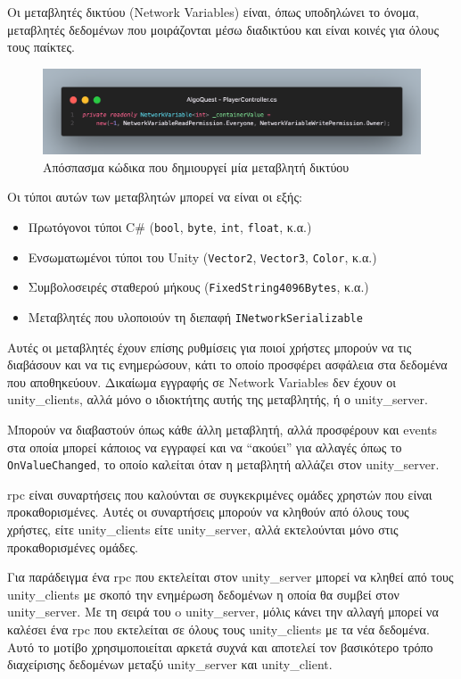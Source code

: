 Οι μεταβλητές δικτύου (Network Variables) είναι, όπως υποδηλώνει το όνομα, μεταβλητές δεδομένων που μοιράζονται μέσω διαδικτύου και είναι κοινές για όλους τους παίκτες.

\begin{figure}[H]
    \centering
    \includegraphics[width=0.8\linewidth]{sections/4/4/images/unity_code_network_variable}
    \caption{Απόσπασμα κώδικα που δημιουργεί μία μεταβλητή δικτύου}
    \label{fig:unity_code_network_variable}
\end{figure}

Οι τύποι αυτών των μεταβλητών μπορεί να είναι οι εξής:
\begin{itemize}
    \item Πρωτόγονοι τύποι C\# (\verb|bool|, \verb|byte|, \verb|int|, \verb|float|, κ.α.)
    \item Ενσωματωμένοι τύποι του Unity (\verb|Vector2|, \verb|Vector3|, \verb|Color|, κ.α.)
    \item Συμβολοσειρές σταθερού μήκους (\verb|FixedString4096Bytes|, κ.α.)
    \item Μεταβλητές που υλοποιούν τη διεπαφή \verb|INetworkSerializable|\cite{noauthor_networkvariables_2024}
\end{itemize}

Αυτές οι μεταβλητές έχουν επίσης ρυθμίσεις για ποιοί χρήστες μπορούν να τις διαβάσουν και να τις ενημερώσουν, κάτι το οποίο προσφέρει ασφάλεια στα δεδομένα που αποθηκεύουν. Δικαίωμα εγγραφής σε Network Variables δεν έχουν οι \Glspl{unity_client}, αλλά μόνο ο ιδιοκτήτης αυτής της μεταβλητής, ή ο \Gls{unity_server}.

Μπορούν να διαβαστούν όπως κάθε άλλη μεταβλητή, αλλά προσφέρουν και events στα οποία μπορεί κάποιος να εγγραφεί και να “ακούει” για αλλαγές όπως το \verb|OnValueChanged|, το οποίο καλείται όταν η μεταβλητή αλλάζει στον \Gls{unity_server}.

\acrfull{rpc} είναι συναρτήσεις που καλούνται σε συγκεκριμένες ομάδες χρηστών που είναι προκαθορισμένες. Αυτές οι συναρτήσεις μπορούν να κληθούν από όλους τους χρήστες, είτε \Glspl{unity_client} είτε \Gls{unity_server}, αλλά εκτελούνται μόνο στις προκαθορισμένες ομάδες\cite{noauthor_rpc_2024}.

Για παράδειγμα ένα \acrshort{rpc} που εκτελείται στον \Gls{unity_server} μπορεί να κληθεί από τους \Glspl{unity_client} με σκοπό την ενημέρωση δεδομένων η οποία θα συμβεί στον \Gls{unity_server}. Με τη σειρά του o \Gls{unity_server}, μόλις κάνει την αλλαγή μπορεί να καλέσει ένα \acrshort{rpc} που εκτελείται σε όλους τους \Glspl{unity_client} με τα νέα δεδομένα. Αυτό το μοτίβο χρησιμοποιείται αρκετά συχνά και αποτελεί τον βασικότερο τρόπο διαχείρισης δεδομένων μεταξύ \Gls{unity_server} και \Gls{unity_client}.

